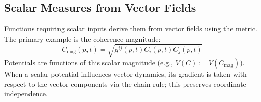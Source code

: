 \subsection{Scalar Measures from Vector Fields}\label{sec:scalar_measures_from_vector_fields}

Functions requiring scalar inputs derive them from vector fields using the metric. The primary example is the coherence magnitude:
\begin{equation}
C_{\mathrm{mag}}(p,t) = \sqrt{g^{ij}(p,t) C_i(p,t) C_j(p,t)}
\end{equation}
Potentials are functions of this scalar magnitude (e.g., \(V(C) := V(C_{\mathrm{mag}})\)). When a scalar potential influences vector dynamics, its gradient is taken with respect to the vector components via the chain rule; this preserves coordinate independence. 